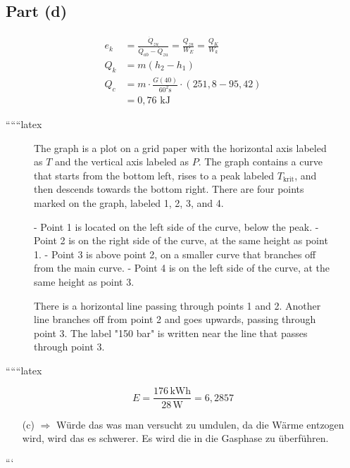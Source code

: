 \subsection*{Part (d)}

\begin{align*}
    e_{k} &= \frac{\dot{Q}_{zu}}{\dot{Q}_{ab} - \dot{Q}_{zu}} = \frac{Q_{zu}}{W_E} = \frac{Q_K}{W_k} \\
    Q_{k} &= m(h_2 - h_1) \\
    Q_{c} &= m \cdot \frac{G(40)}{60^2 \text{s}} \cdot (251,8 - 95,42) \\
    &= 0,76 \text{ kJ}
\end{align*}

``````latex


\begin{figure}[h]
    \centering
    The graph is a plot on a grid paper with the horizontal axis labeled as \( T \) and the vertical axis labeled as \( P \). The graph contains a curve that starts from the bottom left, rises to a peak labeled \( T_{\text{krit}} \), and then descends towards the bottom right. There are four points marked on the graph, labeled 1, 2, 3, and 4. 
    
    - Point 1 is located on the left side of the curve, below the peak.
    - Point 2 is on the right side of the curve, at the same height as point 1.
    - Point 3 is above point 2, on a smaller curve that branches off from the main curve.
    - Point 4 is on the left side of the curve, at the same height as point 3.
    
    There is a horizontal line passing through points 1 and 2. Another line branches off from point 2 and goes upwards, passing through point 3. The label "150 bar" is written near the line that passes through point 3.
\end{figure}

``````latex


\[
E = \frac{176 \, \text{kWh}}{28 \, \text{W}} = 6,2857
\]

\begin{itemize}
    \item[(c)] \(\Rightarrow\) Würde das was man versucht zu umdulen, da die Wärme entzogen wird, wird das es schwerer. Es wird die in die Gasphase zu überführen.
\end{itemize}

```